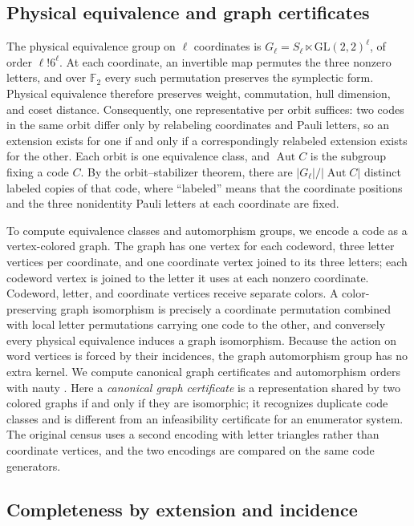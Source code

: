 \documentclass[11pt]{article}
\theoremstyle{definition}
\theoremstyle{remark}
\newcommand{\F}{\mathbb F_2}
\newcommand{\Aut}{\operatorname{Aut}}
\begin{document}
\subsection{Physical equivalence and graph certificates}

The physical equivalence group on \(\ell\) coordinates is
\(G_\ell=S_\ell\ltimes\mathrm{GL}(2,2)^\ell\), of order
\(\ell!6^\ell\). At each coordinate, an invertible map permutes the
three nonzero letters, and over \(\F\) every such permutation preserves
the symplectic form. Physical equivalence therefore preserves weight,
commutation, hull dimension, and coset distance. Consequently, one
representative per orbit suffices: two codes in the same orbit differ
only by relabeling coordinates and Pauli letters, so an extension exists
for one if and only if a correspondingly relabeled extension exists for
the other. Each orbit is one equivalence class, and \(\Aut C\) is the
subgroup fixing a code \(C\). By the orbit--stabilizer theorem, there
are \(|G_\ell|/|\Aut C|\) distinct labeled copies of that code, where
``labeled'' means that the coordinate positions and the three
nonidentity Pauli letters at each coordinate are fixed.

To compute equivalence classes and automorphism groups, we encode a code
as a vertex-colored graph. The graph has one vertex for each codeword,
three letter vertices per coordinate, and one coordinate vertex joined
to its three letters; each codeword vertex is joined to the letter it
uses at each nonzero coordinate. Codeword, letter, and coordinate
vertices receive separate colors. A color-preserving graph isomorphism is
precisely a coordinate permutation combined with local letter
permutations carrying one code to the other, and conversely every
physical equivalence induces a graph isomorphism. Because the action on
word vertices is forced by their incidences, the graph automorphism
group has no extra kernel. We compute canonical graph certificates and
automorphism orders with nauty \cite{nauty}. Here a \emph{canonical
graph certificate} is a representation shared by two colored graphs if
and only if they are isomorphic; it recognizes duplicate code classes
and is different from an infeasibility certificate for an enumerator
system. The original census uses a second encoding with letter triangles
rather than coordinate vertices, and the two encodings are compared on
the same code generators.

\subsection{Completeness by extension and incidence}
\end{document}
